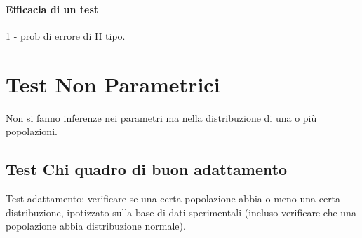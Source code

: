 \paragraph*{Efficacia di un test} 1 - prob di errore di II tipo.

\section*{Test Non Parametrici} Non si fanno inferenze nei parametri ma nella
distribuzione di una o più popolazioni.
\subsection{Test Chi quadro di buon adattamento}
Test adattamento: verificare se una certa popolazione abbia o meno una certa distribuzione,
ipotizzato sulla base di dati sperimentali (incluso verificare che una popolazione
abbia distribuzione normale).
